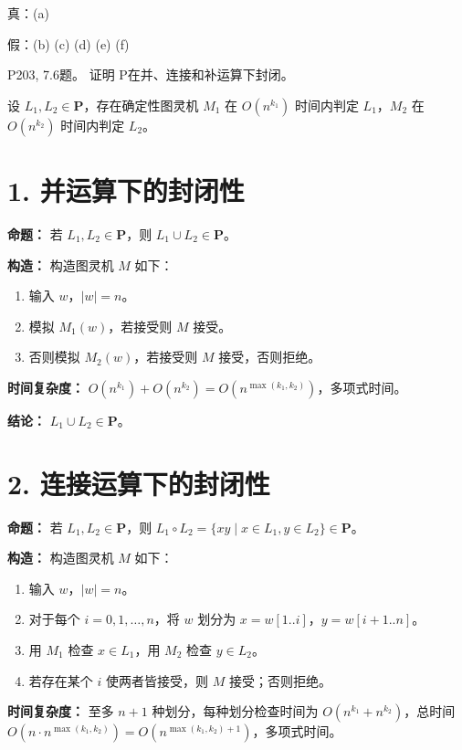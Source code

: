 \documentclass[11pt,addpoints,answers]{exam}
\begin{document}
\begin{questions}
 
\begin{solution}
	真：(a) 
    
    假：(b) (c) (d) (e) (f)
\end{solution}


\question P203, 7.6题。
证明 P在并、连接和补运算下封闭。
\begin{solution}
	
    设 $L_1, L_2 \in \mathbf{P}$，存在确定性图灵机 $M_1$ 在 $O(n^{k_1})$ 时间内判定 $L_1$，$M_2$ 在 $O(n^{k_2})$ 时间内判定 $L_2$。
    \section*{1. 并运算下的封闭性}
    \textbf{命题：} 若 $L_1, L_2 \in \mathbf{P}$，则 $L_1 \cup L_2 \in \mathbf{P}$。
    
    \textbf{构造：} 构造图灵机 $M$ 如下：
    \begin{enumerate}
        \item 输入 $w$，$|w|=n$。
        \item 模拟 $M_1(w)$，若接受则 $M$ 接受。
        \item 否则模拟 $M_2(w)$，若接受则 $M$ 接受，否则拒绝。
    \end{enumerate}
    \textbf{时间复杂度：} $O(n^{k_1}) + O(n^{k_2}) = O(n^{\max(k_1,k_2)})$，多项式时间。
    
    \textbf{结论：} $L_1 \cup L_2 \in \mathbf{P}$。
    \section*{2. 连接运算下的封闭性}
    \textbf{命题：} 若 $L_1, L_2 \in \mathbf{P}$，则 $L_1 \circ L_2 = \{ xy \mid x \in L_1, y \in L_2 \} \in \mathbf{P}$。
    
    \textbf{构造：} 构造图灵机 $M$ 如下：
    \begin{enumerate}
        \item 输入 $w$，$|w|=n$。
        \item 对于每个 $i = 0,1,\dots,n$，将 $w$ 划分为 $x = w[1..i]$，$y = w[i+1..n]$。
        \item 用 $M_1$ 检查 $x \in L_1$，用 $M_2$ 检查 $y \in L_2$。
        \item 若存在某个 $i$ 使两者皆接受，则 $M$ 接受；否则拒绝。
    \end{enumerate}
    \textbf{时间复杂度：} 至多 $n+1$ 种划分，每种划分检查时间为 $O(n^{k_1} + n^{k_2})$，总时间 $O(n \cdot n^{\max(k_1,k_2)}) = O(n^{\max(k_1,k_2)+1})$，多项式时间。
    

\end{solution}
\end{questions}
\end{document}
